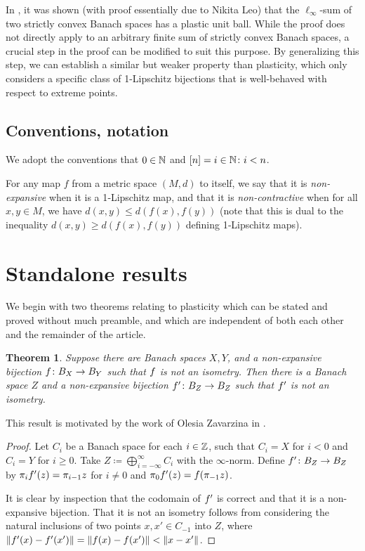 \documentclass{amsart}
\newtheorem{theorem}{Theorem}
\theoremstyle{definition}
\begin{document}
In \autocite{haller:2022}, it was shown (with proof essentially due to Nikita Leo)
that the $\ell_\infty$-sum of two strictly
convex Banach spaces has a plastic unit ball. While the proof does not directly apply to an arbitrary finite sum of strictly convex Banach spaces, a crucial step in the proof can be modified to suit this purpose. By generalizing this step, we can establish a similar but weaker property than plasticity, which only considers a specific class of
1-Lipschitz bijections that is well-behaved with respect to extreme points.

\subsection{Conventions, notation}

We adopt the conventions that $0 \in \mathbb{N}$ and $[n] = {i \in \mathbb{N} \colon i < n}$.

For any map $f$ from a metric space $(M,d)$ to itself,
we say that it is \textit{non-expansive} when it is a 1‑Lipschitz
map, and that it is \textit{non-contractive} when for all
$x, y \in M$, we have $d(x,y) \leq d(f(x), f(y))$ (note
that this is dual to the inequality $d(x,y) \geq d(f(x), f(y))$ defining
1‑Lipschitz maps).

\section{Standalone results}

We begin with two theorems relating to plasticity which can be stated and proved without much preamble, and which are independent of both each other and the remainder of the article.


\begin{theorem}
    Suppose there are Banach spaces $X, Y$, and a non-expansive bijection $f \colon B_X \to B_Y$ such that $f$ is not an isometry. Then there is a Banach space $Z$ and a non-expansive bijection $f' \colon B_Z \to B_Z$ such that $f'$ is not an isometry.
\end{theorem}

This result is motivated by the work of Olesia Zavarzina in \autocite{zavarzina:2017}.

\begin{proof}
    Let $C_i$ be a Banach space for each $i \in \mathbb{Z}$, such that $C_i = X$
    for $i < 0$ and $C_i = Y$ for $i \geq 0$. Take $Z \coloneqq \bigoplus_{i=-\infty}^\infty C_i$ with the $\infty$-norm. Define $f' \colon B_Z \to B_Z$ by $\pi_i f'(z) = \pi_{i-1} z$ for $i \neq 0$ and $\pi_0 f'(z) = f(\pi_{-1}z)$.
  
    It is clear by inspection that the codomain of $f'$ is correct and that it is a non-expansive bijection. That it is not an isometry follows from considering the natural inclusions of two points $x, x' \in C_{-1}$ into $Z$, where $\norm{f'(x) - f'(x')} = \norm{f(x)-f(x')} < \norm{x-x'}$.
\end{proof}
\end{document}

